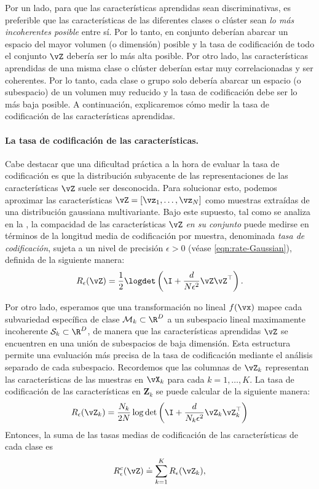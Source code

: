 \documentclass[../../book-main.tex]{subfiles}
\begin{document}
Por un lado, para que las características aprendidas sean discriminativas, es preferible que las características de
las diferentes clases o clúster sean {\em lo más
incoherentes posible} entre sí. Por lo tanto, en conjunto deberían abarcar un espacio
del mayor volumen (o dimensión) posible y la tasa de codificación
de todo el conjunto $\vZ$ debería ser lo más alta posible. Por otro lado,
las características aprendidas de una misma clase o clúster deberían estar muy
correlacionadas y ser coherentes. Por lo tanto, cada clase o grupo solo debería abarcar un
espacio (o subespacio) de un volumen muy reducido y la tasa de codificación debe
ser lo más baja posible. A continuación, explicaremos cómo medir la
tasa de codificación de las características aprendidas.

\paragraph{La tasa de codificación de las características.} Cabe destacar que una dificultad práctica
a la hora de evaluar la tasa de codificación es que la distribución subyacente de
las representaciones de las características $\vZ$ suele ser desconocida. Para solucionar
esto, podemos aproximar las características $\vZ = [\vz_1, \ldots, \vz_N]$ como
muestras extraídas de una distribución gaussiana multivariante. Bajo este
supuesto, tal como se analiza en la , la compacidad
de las características $\vZ$ {\em en su conjunto} puede medirse en términos de la
longitud media de codificación por muestra, denominada {\em tasa de codificación}, 
sujeta a un nivel de precisión $\epsilon > 0$ (véase
\eqref{eqn:rate-Gaussian}), definida de la siguiente manera:
\begin{equation}
    R_{\epsilon}(\vZ) = \frac{1}{2}\logdet\left(\I +
    \frac{d}{N\epsilon^{2}}\vZ\vZ^{\top}\right).
    \label{chap4-eqn:coding-length-eval}
\end{equation}

Por otro lado, esperamos que una transformación no lineal $f(\vx)$
mapee cada subvariedad específica de clase $\mathcal{M}_k \subset
\R^D$ a un subespacio lineal maximamente incoherente
$\mathcal{S}_k \subset \R^D$, de manera que las características aprendidas
$\vZ$ se encuentren en una unión de subespacios de baja dimensión. Esta estructura
permite una evaluación más precisa de la tasa de codificación mediante el análisis
separado de cada subespacio. %
Recordemos que las columnas de $\vZ_k$ representan las características de las muestras
en $\vX_k$ para cada $k=1,\dots,K$. La tasa de codificación de las características en
$\bm Z_k$ se puede calcular de la siguiente manera:
\begin{align}
    R_{\epsilon}(\vZ_k) = \frac{N_k}{2N}\log\det\left(\I +
    \frac{d}{N_k\epsilon^{2}}\vZ_k\vZ_k^{\top}\right)
\end{align}
Entonces, la suma de las tasas medias de codificación de las características de cada clase es
\begin{equation}
    R_{\epsilon}^c(\vZ) \doteq \sum_{k=1}^K R_{\epsilon}(\vZ_k),
    \label{chap4-eqn:compress-loss-eval}
\end{equation}
\end{document}
